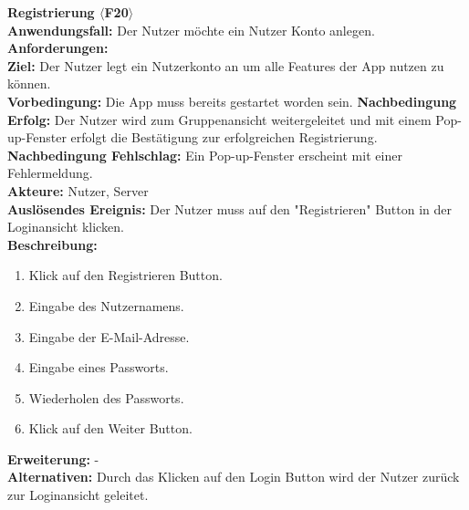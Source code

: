 \documentclass[parskip=full]{scrartcl}
\begin{document}
\textbf{Registrierung $\langle$F20$\rangle$}\\
\textbf{Anwendungsfall:} Der Nutzer möchte ein Nutzer Konto anlegen.\\
\textbf{Anforderungen:} \\
\textbf{Ziel:} Der Nutzer legt ein Nutzerkonto an um alle Features der App nutzen zu können.\\
\textbf{Vorbedingung:} Die App muss bereits gestartet worden sein.
\textbf{Nachbedingung Erfolg:} Der Nutzer wird zum Gruppenansicht weitergeleitet und mit einem Pop-up-Fenster erfolgt die Bestätigung zur erfolgreichen Registrierung.\\
\textbf{Nachbedingung Fehlschlag:} Ein Pop-up-Fenster erscheint mit einer Fehlermeldung.\\
\textbf{Akteure:} Nutzer, Server\\
\textbf{Auslösendes Ereignis:} Der Nutzer muss auf den "Registrieren" Button in der Loginansicht klicken.\\
\textbf{Beschreibung:}
\begin{enumerate}
    \item Klick auf den Registrieren Button.
    \item Eingabe des Nutzernamens.
    \item Eingabe der E-Mail-Adresse.
    \item Eingabe eines Passworts.
    \item Wiederholen des Passworts.
    \item Klick auf den Weiter Button.
\end{enumerate}
\textbf{Erweiterung:} -\\
\textbf{Alternativen:} Durch das Klicken auf den Login Button wird der Nutzer zurück zur Loginansicht geleitet.\\
\newpage
\end{document}
